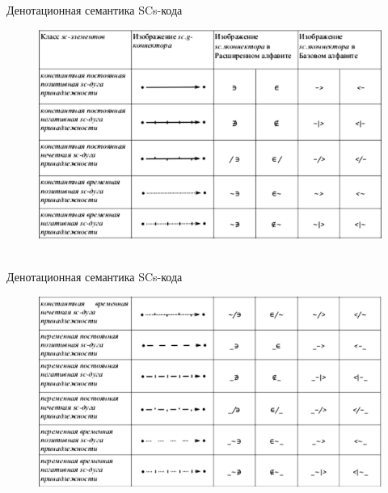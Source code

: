 \begin{frame}{\\Денотационная семантика SCs-кода}
	\topline
	\justifying
	\vspace*{\fill}\\
	\begin{SCn}
		\begin{figure}[H]
			\includegraphics[scale=0.5]{./figures/external_langs/table_scs_1.png}
		\end{figure}
		\end{SCn}
	\end{frame}

\begin{frame}{\\Денотационная семантика SCs-кода}
	\topline
	\justifying
	\vspace*{\fill}\\
	\begin{SCn}
		\begin{figure}[H]
			\includegraphics[scale=0.5]{./figures/external_langs/table_scs_2.png}
		\end{figure}
	\end{SCn}
\end{frame}


